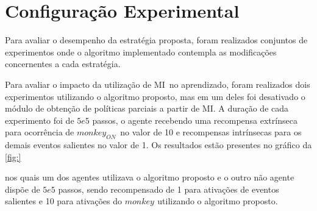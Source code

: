 \documentclass[kdmile,a4paper]{kdmile} %
\begin{document}

\section{Configuração Experimental}
Para avaliar o desempenho da estratégia proposta, foram realizados
conjuntos de experimentos onde o algoritmo implementado contempla as
modificações concernentes a cada estratégia.


\newcommand{\mi}{MI}

\newcommand{\mon}{$monkey_{ON}$} Para avaliar o impacto da utilização
de \mi\ no aprendizado, foram realizados dois experimentos utilizando
o algoritmo proposto, mas em um deles foi desativado o módulo de
obtenção de políticas parciais a partir de \mi. A duração de cada
experimento foi de $5e5$ passos, o agente recebendo uma recompensa
extrínseca para ocorrência de \mon\ no valor de 10 e recompensas
intrínsecas para os demais eventos salientes no valor de 1. Os
resultados estão presentes no gráfico da \ref{fig:}

nos quais um dos agentes utilizava o algoritmo proposto e o outro não
agente dispõe de $5e5$ passos, sendo recompensado de 1 para ativações
de eventos salientes e 10 para ativações do $monkey_{}$ utilizando o
algoritmo proposto.
\end{document}
